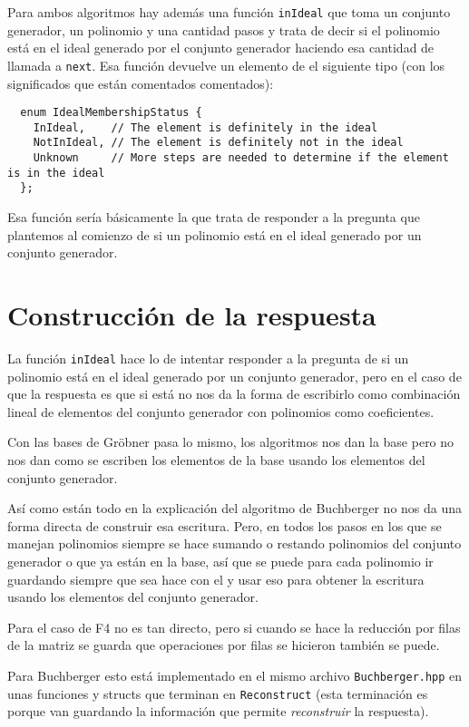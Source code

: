 \documentclass{report}
\theoremstyle{customstyle}
\theoremstyle{factstyle}
\begin{document}
Para ambos algoritmos hay además una función \texttt{inIdeal} que toma un conjunto generador, un polinomio y una cantidad pasos y trata de decir si el polinomio está en el ideal generado por el conjunto generador haciendo esa cantidad de llamada a \texttt{next}. Esa función devuelve un elemento de el siguiente tipo (con los significados que están comentados comentados):

\begin{verbatim}
  enum IdealMembershipStatus {
    InIdeal,    // The element is definitely in the ideal
    NotInIdeal, // The element is definitely not in the ideal
    Unknown     // More steps are needed to determine if the element is in the ideal
  };
\end{verbatim}

Esa función sería básicamente la que trata de responder a la pregunta que plantemos al comienzo de si un polinomio está en el ideal generado por un conjunto generador.

\section{Construcción de la respuesta}\label{section:construcción de la respuesta (librería)}

La función \texttt{inIdeal} hace lo de intentar responder a la pregunta de si un polinomio está en el ideal generado por un conjunto generador, pero en el caso de que la respuesta es que si está no nos da la forma de escribirlo como combinación lineal de elementos del conjunto generador con polinomios como coeficientes.

Con las bases de Gröbner pasa lo mismo, los algoritmos nos dan la base pero no nos dan como se escriben los elementos de la base usando los elementos del conjunto generador.

Así como están todo en la explicación del algoritmo de Buchberger no nos da una forma directa de construir esa escritura. Pero, en todos los pasos en los que se manejan polinomios siempre se hace sumando o restando polinomios del conjunto generador o que ya están en la base, así que se puede para cada polinomio ir guardando siempre que sea hace con el y usar eso para obtener la escritura usando los elementos del conjunto generador.

Para el caso de F4 no es tan directo, pero si cuando se hace la reducción por filas de la matriz se guarda que operaciones por filas se hicieron también se puede.

Para Buchberger esto está implementado en el mismo archivo \texttt{Buchberger.hpp} en unas funciones y structs que terminan en \texttt{Reconstruct} (esta terminación es porque van guardando la información que permite \emph{reconstruir} la respuesta).
\end{document}
